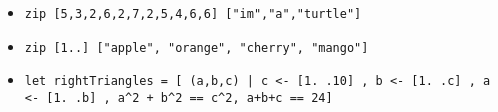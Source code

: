 \documentclass[a4paper,10pt]{article}
\begin{document}
\begin{enumerate}
\begin{enumerate}
\begin{itemize}
\begin{itemize}
\begin{itemize}
    \item \texttt{zip [5,3,2,6,2,7,2,5,4,6,6] ["im","a","turtle"]}
    \item \texttt{zip [1..] ["apple", "orange", "cherry", "mango"]}
    \item \texttt{let rightTriangles\textquotesingle \  = [ (a,b,c) | c <- [1. .10] , b <- [1. .c] , a <- [1. .b] , a\^{}2 + b\^{}2 == c\^{}2, a+b+c == 24]}
   \end{itemize}
  \end{itemize}
  \end{itemize}
  \end{enumerate}
  

\end{enumerate}
\end{document}
